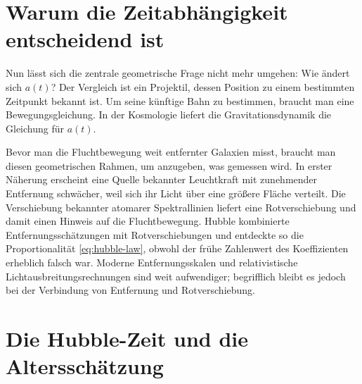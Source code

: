 \section{Warum die Zeitabhängigkeit entscheidend ist}

Nun lässt sich die zentrale geometrische Frage nicht mehr umgehen: Wie ändert sich \(a(t)\)? Der Vergleich ist ein Projektil, dessen Position zu einem bestimmten Zeitpunkt bekannt ist. Um seine künftige Bahn zu bestimmen, braucht man eine Bewegungsgleichung. In der Kosmologie liefert die Gravitationsdynamik die Gleichung für \(a(t)\).

\begin{classroomqa}
\end{classroomqa}

Bevor man die Fluchtbewegung weit entfernter Galaxien misst, braucht man diesen geometrischen Rahmen, um anzugeben, was gemessen wird. In erster Näherung erscheint eine Quelle bekannter Leuchtkraft mit zunehmender Entfernung schwächer, weil sich ihr Licht über eine größere Fläche verteilt. Die Verschiebung bekannter atomarer Spektrallinien liefert eine Rotverschiebung und damit einen Hinweis auf die Fluchtbewegung. Hubble kombinierte Entfernungsschätzungen mit Rotverschiebungen und entdeckte so die Proportionalität \eqref{eq:hubble-law}, obwohl der frühe Zahlenwert des Koeffizienten erheblich falsch war. Moderne Entfernungsskalen und relativistische Lichtausbreitungsrechnungen sind weit aufwendiger; begrifflich bleibt es jedoch bei der Verbindung von Entfernung und Rotverschiebung.

\section{Die Hubble-Zeit und die Altersschätzung}

